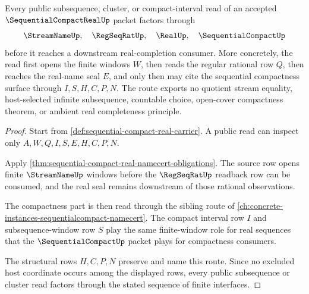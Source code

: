\begin{theorem}
\label{thm:sequential-compact-real-regseqrat-route}
Every public subsequence, cluster, or compact-interval read of an accepted $\SequentialCompactRealUp$ packet factors through
$$
\StreamNameUp,\quad \RegSeqRatUp,\quad \RealUp,\quad \SequentialCompactUp
$$
before it reaches a downstream real-completion consumer. More concretely, the read first opens the finite windows $W$, then reads the regular rational row $Q$, then reaches the real-name seal $E$, and only then may cite the sequential compactness surface through $I,S,H,C,P,N$. The route exports no quotient stream equality, host-selected infinite subsequence, countable choice, open-cover compactness theorem, or ambient real completeness principle.
\end{theorem}
\begin{proof}
Start from \autoref{def:sequential-compact-real-carrier}. A public read can inspect only $A,W,Q,I,S,E,H,C,P,N$.

Apply \autoref{thm:sequential-compact-real-namecert-obligations}. The source row opens finite $\StreamNameUp$ windows before the $\RegSeqRatUp$ readback row can be consumed, and the real seal remains downstream of those rational observations.

The compactness part is then read through the sibling route of \autoref{ch:concrete-instances-sequentialcompact-namecert}. The compact interval row $I$ and subsequence-window row $S$ play the same finite-window role for real sequences that the $\SequentialCompactUp$ packet plays for compactness consumers.

The structural rows $H,C,P,N$ preserve and name this route. Since no excluded host coordinate occurs among the displayed rows, every public subsequence or cluster read factors through the stated sequence of finite interfaces.
\end{proof}


